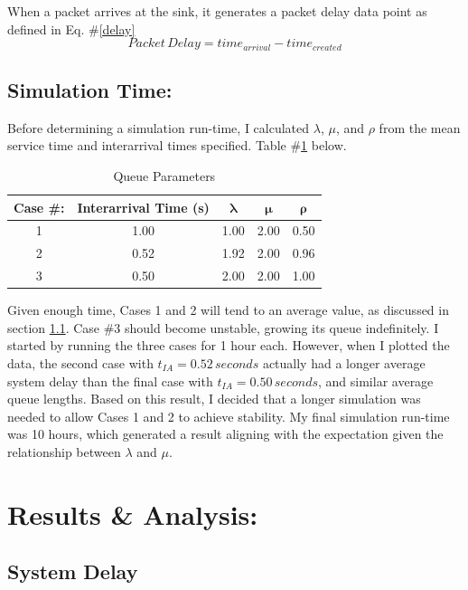 \documentclass{article}
\begin{document}
When a packet arrives at the sink, it generates a packet delay data point as defined in Eq. \#\ref{delay}
\begin{equation}
	\label{delay}
	Packet \, Delay = time_{arrival} - time_{created}
\end{equation}

\newpage
\subsection{Simulation Time:}  
Before determining a simulation run-time, I calculated $\lambda$, $\mu$, and $\rho$ from the mean service time and interarrival times specified.
Table \#\ref{Parameters} below.
\begin{table}[h!]
\centering
\begin{tabular}{|c|c|c|c|c|} \hline
\textbf{Case \#:} & \textbf{Interarrival Time (s)} & $\mathbf{\lambda}$ & $\mathbf{\mu}$ & $\mathbf{\rho}$ \\ \hline
1 & 1.00 & 1.00 & 2.00 & 0.50 \\ \hline
2 & 0.52 & 1.92 & 2.00 & 0.96 \\ \hline
3 & 0.50 & 2.00 & 2.00 & 1.00 \\ \hline 
\end{tabular}
\caption{Queue Parameters}
\label{Parameters}
\end{table}

Given enough time, Cases 1 and 2 will tend to an average value, as discussed in section \ref{sec:SysDelay}. 
Case \#3 should become unstable, growing its queue indefinitely.
I started by running the three cases for 1 hour each.  
However, when I plotted the data, the second case with $t_{IA}=0.52 \, seconds$ actually had a longer average system delay than the final case with $t_{IA}=0.50 \, seconds$, and similar average queue lengths.  
Based on this result, I decided that a longer simulation was needed to allow Cases 1 and 2 to achieve stability.  
My final simulation run-time was 10 hours, which generated a result aligning with the expectation given the relationship between $\lambda$ and $\mu$.

\section{Results \& Analysis:}

\subsection{System Delay}
\label{sec:SysDelay}
\end{document}
